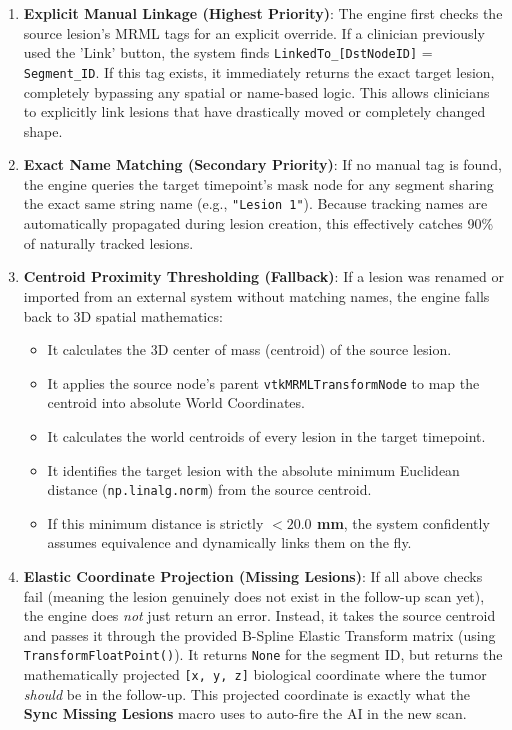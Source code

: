 \documentclass[a4paper,10pt]{article}
\begin{document}
\begin{enumerate}
    \item \textbf{Explicit Manual Linkage (Highest Priority)}: 
    The engine first checks the source lesion's MRML tags for an explicit override. If a clinician previously used the 'Link' button, the system finds \texttt{LinkedTo\_[DstNodeID]} = \texttt{Segment\_ID}. If this tag exists, it immediately returns the exact target lesion, completely bypassing any spatial or name-based logic. This allows clinicians to explicitly link lesions that have drastically moved or completely changed shape.

    \item \textbf{Exact Name Matching (Secondary Priority)}: 
    If no manual tag is found, the engine queries the target timepoint's mask node for any segment sharing the exact same string name (e.g., \texttt{"Lesion 1"}). Because tracking names are automatically propagated during lesion creation, this effectively catches 90\% of naturally tracked lesions.

    \item \textbf{Centroid Proximity Thresholding (Fallback)}: 
    If a lesion was renamed or imported from an external system without matching names, the engine falls back to 3D spatial mathematics:
    \begin{itemize}
        \item It calculates the 3D center of mass (centroid) of the source lesion.
        \item It applies the source node's parent \texttt{vtkMRMLTransformNode} to map the centroid into absolute World Coordinates.
        \item It calculates the world centroids of every lesion in the target timepoint.
        \item It identifies the target lesion with the absolute minimum Euclidean distance (\texttt{np.linalg.norm}) from the source centroid.
        \item If this minimum distance is strictly \textbf{$< 20.0$ mm}, the system confidently assumes equivalence and dynamically links them on the fly.
    \end{itemize}

    \item \textbf{Elastic Coordinate Projection (Missing Lesions)}: 
    If all above checks fail (meaning the lesion genuinely does not exist in the follow-up scan yet), the engine does \textit{not} just return an error. Instead, it takes the source centroid and passes it through the provided B-Spline Elastic Transform matrix (using \texttt{TransformFloatPoint()}). It returns \texttt{None} for the segment ID, but returns the mathematically projected \texttt{[x, y, z]} biological coordinate where the tumor \textit{should} be in the follow-up. This projected coordinate is exactly what the \textbf{Sync Missing Lesions} macro uses to auto-fire the AI in the new scan.
\end{enumerate}
\end{document}
